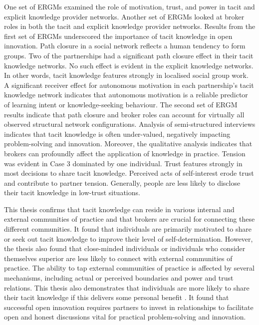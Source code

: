 One set of ERGMs examined the role of motivation, trust, and power in tacit and explicit knowledge provider networks. Another set of ERGMs looked at broker roles in both the tacit and explicit knowledge provider networks. Results from the first set of ERGMs underscored the importance of tacit knowledge in open innovation. Path closure in a social network reflects a human tendency to form groups. Two of the partnerships had a significant path closure effect in their tacit knowledge networks. No such effect is evident in the explicit knowledge networks. In other words, tacit knowledge features strongly in localised social group work. A significant receiver effect for autonomous motivation in each partnership's tacit knowledge network indicates that autonomous motivation is a reliable predictor of learning intent or knowledge-seeking behaviour. The second set of ERGM results indicate that path closure and broker roles can account for virtually all observed structural network configurations. Analysis of semi-structured interviews indicates that tacit knowledge is often under-valued, negatively impacting problem-solving and innovation. Moreover, the qualitative analysis indicates that brokers can profoundly affect the application of knowledge in practice. Tension was evident in Case 3 dominated by one individual. Trust features strongly in most decisions to share tacit knowledge. Perceived acts of self-interest erode trust and contribute to partner tension. Generally, people are less likely to disclose their tacit knowledge in low-trust situations. \medskip

This thesis confirms that tacit knowledge can reside in various internal and external communities of practice and that brokers are crucial for connecting these different communities. It found that individuals are primarily motivated to share or seek out tacit knowledge to improve their level of self-determination. However, the thesis also found that close-minded individuals or individuals who consider themselves superior are less likely to connect with external communities of practice. The ability to tap external communities of practice is affected by several mechanisms, including actual or perceived boundaries and power and trust relations. This thesis also demonstrates that individuals are more likely to share their tacit knowledge if this delivers some personal benefit \citep{liu2021more}. It found that successful open innovation requires partners to invest in relationships to facilitate open and honest discussions vital for practical problem-solving and innovation.

